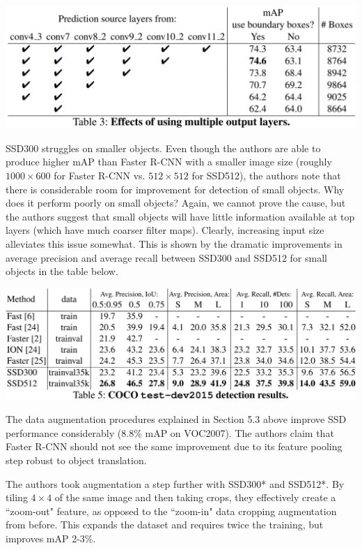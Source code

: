 \documentclass{article}
\begin{document}
\begin{center}
\includegraphics[scale=0.4]{ssdlayers.PNG}
\end{center}

SSD300 struggles on smaller objects. Even though the authors are able to produce higher mAP than Faster R-CNN with a smaller image size (roughly $1000\times600$ for Faster R-CNN vs. $512\times512$ for SSD512), the authors note that there is considerable room for improvement for detection of small objects. Why does it perform poorly on small objects? Again, we cannot prove the cause, but the authors suggest that small objects will have little information available at top layers (which have much coarser filter maps). Clearly, increasing input size alleviates this issue somewhat. This is shown by the dramatic improvements in average precision and average recall between SSD300 and SSD512 for small objects in the table below.

\begin{center}
\includegraphics[scale=0.35]{ssdcoco.PNG}
\end{center}

The data augmentation procedures explained in Section 5.3 above improve SSD performance considerably (8.8\% mAP on VOC2007). The authors claim that Faster R-CNN should not see the same improvement due to its feature pooling step robust to object translation.

The authors took augmentation a step further with SSD300* and SSD512*. By tiling $4\times4$ of the same image and then taking crops, they effectively create a ``zoom-out" feature, as opposed to the ``zoom-in" data cropping augmentation from before. This expands the dataset and requires twice the training, but improves mAP 2-3\%.
\end{document}
